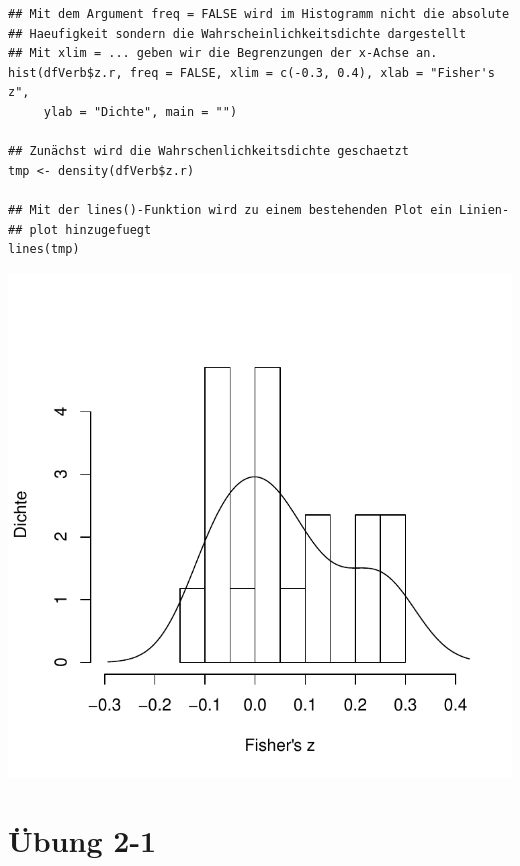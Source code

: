 \documentclass[normalheadings, 10pt]{scrartcl}\usepackage{graphicx, color}
\makeatletter
\def\maxwidth{ %
  \ifdim\Gin@nat@width>\linewidth
    \linewidth
  \else
    \Gin@nat@width
  \fi
}
\newenvironment{kframe}{%
 \def\at@end@of@kframe{}%
 \ifinner\ifhmode%
  \def\at@end@of@kframe{\end{minipage}}%
  \begin{minipage}{\columnwidth}%
 \fi\fi%
 \def\FrameCommand##1{\hskip\@totalleftmargin \hskip-\fboxsep
 \colorbox{shadecolor}{##1}\hskip-\fboxsep
     \hskip-\linewidth \hskip-\@totalleftmargin \hskip\columnwidth}%
 \MakeFramed {\advance\hsize-\width
   \@totalleftmargin\z@ \linewidth\hsize
   \@setminipage}}%
 {\par\unskip\endMakeFramed%
 \at@end@of@kframe}
\newenvironment{knitrout}{}{} %
\makeatother
\begin{document}
\begin{rbsp}
\begin{knitrout}
\color{fgcolor}\begin{kframe}
\begin{verbatim}
## Mit dem Argument freq = FALSE wird im Histogramm nicht die absolute
## Haeufigkeit sondern die Wahrscheinlichkeitsdichte dargestellt
## Mit xlim = ... geben wir die Begrenzungen der x-Achse an.
hist(dfVerb$z.r, freq = FALSE, xlim = c(-0.3, 0.4), xlab = "Fisher's z",
     ylab = "Dichte", main = "")

## Zunächst wird die Wahrschenlichkeitsdichte geschaetzt
tmp <- density(dfVerb$z.r)

## Mit der lines()-Funktion wird zu einem bestehenden Plot ein Linien-
## plot hinzugefuegt
lines(tmp)
\end{verbatim}
\end{kframe}
\includegraphics[width=\maxwidth]{fig/assign-1-1-11_3} 

\end{knitrout}

\end{rbsp}

\pagebreak

\section{Übung 2-1}
\end{document}
